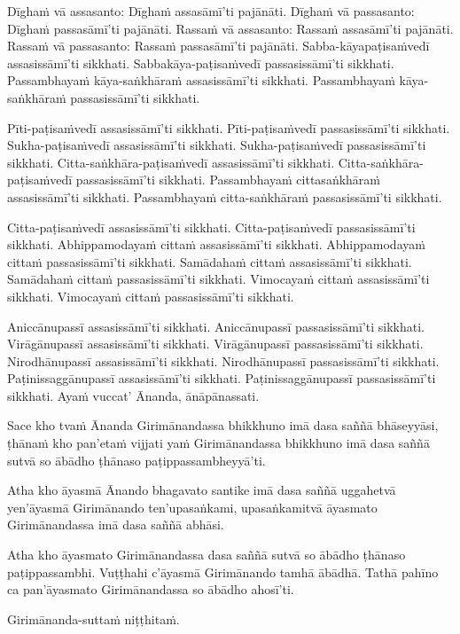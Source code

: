 Dīghaṁ vā assasanto: Dīghaṁ assasāmī’ti pajānāti. Dīghaṁ vā passasanto:
Dīghaṁ passasāmī’ti pajānāti. Rassaṁ vā assasanto: Rassaṁ assasāmī’ti
pajānāti. Rassaṁ vā passasanto: Rassaṁ passasāmī’ti pajānāti.
Sabba-kāyapaṭisaṁvedī assasissāmī’ti sikkhati. Sabbakāya-paṭisaṁvedī
passasissāmī’ti sikkhati. Passambhayaṁ kāya-saṅkhāraṁ assasissāmī’ti
sikkhati. Passambhayaṁ kāya-saṅkhāraṁ passasissāmī’ti sikkhati.

Pīti-paṭisaṁvedī assasissāmī’ti sikkhati. Pīti-paṭisaṁvedī passasissāmī’ti
sikkhati. Sukha-paṭisaṁvedī assasissāmī’ti sikkhati. Sukha-paṭisaṁvedī
passasissāmī’ti sikkhati. Citta-saṅkhāra-paṭisaṁvedī assasissāmī’ti sikkhati.
Citta-saṅkhāra-paṭisaṁvedī passasissāmī’ti sikkhati. Passambhayaṁ
cittasaṅkhāraṁ assasissāmī’ti sikkhati. Passambhayaṁ citta-saṅkhāraṁ
passasissāmī’ti sikkhati.

Citta-paṭisaṁvedī assasissāmī’ti sikkhati. Citta-paṭisaṁvedī passasissāmī’ti
sikkhati. Abhippamodayaṁ cittaṁ assasissāmī’ti sikkhati. Abhippamodayaṁ
cittaṁ passasissāmī’ti sikkhati. Samādahaṁ cittaṁ assasissāmī’ti sikkhati.
Samādahaṁ cittaṁ passasissāmī’ti sikkhati. Vimocayaṁ cittaṁ assasissāmī’ti
sikkhati. Vimocayaṁ cittaṁ passasissāmī’ti sikkhati.

Aniccānupassī assasissāmī’ti sikkhati. Aniccānupassī passasissāmī’ti
sikkhati. Virāgānupassī assasissāmī’ti sikkhati. Virāgānupassī
passasissāmī’ti sikkhati. Nirodhānupassī assasissāmī’ti sikkhati.
Nirodhānupassī passasissāmī’ti sikkhati. Paṭinissaggānupassī assasissāmī’ti
sikkhati. Paṭinissaggānupassī passasissāmī’ti sikkhati. Ayaṁ vuccat’ Ānanda,
ānāpānassati.

Sace kho tvaṁ Ānanda Girimānandassa bhikkhuno imā dasa saññā bhāseyyāsi,
ṭhānaṁ kho pan’etaṁ vijjati yaṁ Girimānandassa bhikkhuno imā dasa saññā sutvā so
ābādho ṭhānaso paṭippassambheyyā'ti.

Atha kho āyasmā Ānando bhagavato santike imā dasa saññā uggahetvā yen’āyasmā
Girimānando ten’upasaṅkami, upasaṅkamitvā āyasmato Girimānandassa imā dasa saññā
abhāsi.

Atha kho āyasmato Girimānandassa dasa saññā sutvā so ābādho ṭhānaso
paṭippassambhi. Vuṭṭhahi c’āyasmā Girimānando tamhā ābādhā. Tathā pahīno ca
pan’āyasmato Girimānandassa so ābādho ahosī'ti.

Girimānanda-suttaṁ niṭṭhitaṁ. 

